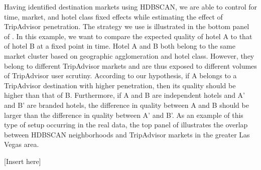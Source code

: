 \documentclass[mksc,blindrev]{informs3} %
\begin{document}
Having identified destination markets using HDBSCAN, we are able to control for time, market, and hotel class fixed effects while estimating the effect of TripAdvisor penetration. The strategy we use is illustrated in the bottom panel of . In this example, we want to compare the expected quality of hotel A to that of hotel B at a fixed point in time. Hotel A and B both belong to the same market cluster based on geographic agglomeration and hotel class. However, they belong to different TripAdvisor markets and are thus exposed to different volumes of TripAdvisor user scrutiny. According to our hypothesis, if A belongs to a TripAdvisor destination with higher penetration, then its quality should be higher than that of B. Furthermore, if A and B are independent hotels and A' and B' are branded hotels, the difference in quality between A and B should be larger than the difference in quality between A' and B'. As an example of this type of setup occurring in the real data, the top panel of  illustrates the overlap between HDBSCAN neighborhoods and TripAdvisor markets in the greater Las Vegas area.

[Insert  here]
\end{document}
